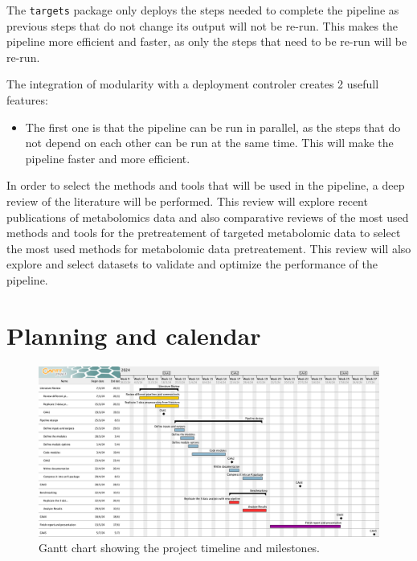 \documentclass[ENG, BIB]{TFUOC}%
\begin{document}
The \texttt{targets} package only deploys the steps needed to complete the pipeline as previous steps that do not change its output will not be re-run. This makes the pipeline more efficient and faster, as only the steps that need to be re-run will be re-run. 

The integration of modularity with a deployment controler creates 2 usefull features:

\begin{itemize}
    \item The first one is that the pipeline can be run in parallel, as the steps that do not depend on each other can be run at the same time. This will make the pipeline faster and more efficient.
\end{itemize}


In order to select the methods and tools that will be used in the pipeline, a deep review of the literature will be performed. This review will explore recent publications of metabolomics data and also comparative reviews of the most used methods and tools for the pretreatement of targeted metabolomic data to select the most used methods for metabolomic data pretreatement. This review will also explore and select datasets to validate and optimize the performance of the pipeline.







\section{Planning and calendar}

\begin{figure}[htbp]
    \centering
    \includegraphics[width=\textwidth]{Images/gantt.png}
    \caption{Gantt chart showing the project timeline and milestones.}
    \label{fig:gantt}
\end{figure}
\end{document}

